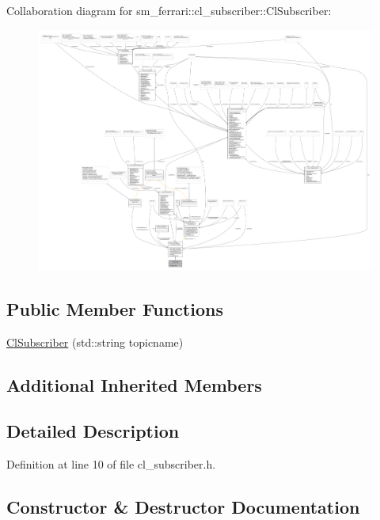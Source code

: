 Collaboration diagram for sm\+\_\+ferrari\+:\+:cl\+\_\+subscriber\+:\+:Cl\+Subscriber\+:
\nopagebreak
\begin{figure}[H]
\begin{center}
\leavevmode
\includegraphics[width=350pt]{classsm__ferrari_1_1cl__subscriber_1_1ClSubscriber__coll__graph}
\end{center}
\end{figure}
\subsection*{Public Member Functions}
\begin{DoxyCompactItemize}
\item 
\hyperlink{classsm__ferrari_1_1cl__subscriber_1_1ClSubscriber_a38c8ff847f2a1155c38f9f9a87a2a28c}{Cl\+Subscriber} (std\+::string topicname)
\end{DoxyCompactItemize}
\subsection*{Additional Inherited Members}


\subsection{Detailed Description}


Definition at line 10 of file cl\+\_\+subscriber.\+h.



\subsection{Constructor \& Destructor Documentation}
\mbox{\label{classsm__ferrari_1_1cl__subscriber_1_1ClSubscriber_a38c8ff847f2a1155c38f9f9a87a2a28c}} 

